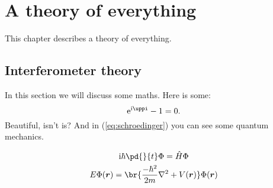 \cleardoublepage
\chapter{A theory of everything}\label{ch:theory}
This chapter describes a theory of everything.
\section{Interferometer theory}\label{s:inttheory}
In this section we will discuss some maths. Here is some:
\begin{equation}
   \e^{\i\pi} - 1 = 0\text{.}
\end{equation}
Beautiful, isn't is? And in (\ref{eq:schroedinger}) you can see some quantum mechanics.

\begin{subequations}\label{eq:schroedinger}
   \begin{gather}
      \i \hbar \pd{}{t}\Phi = \op{H}\Phi\\
      E\Phi(\vec{r}) = \br{\frac{-\hbar^2}{2m} \nabla^2 + V(\vec{r}) } \Phi(\vec{r})
   \end{gather}
\end{subequations}

